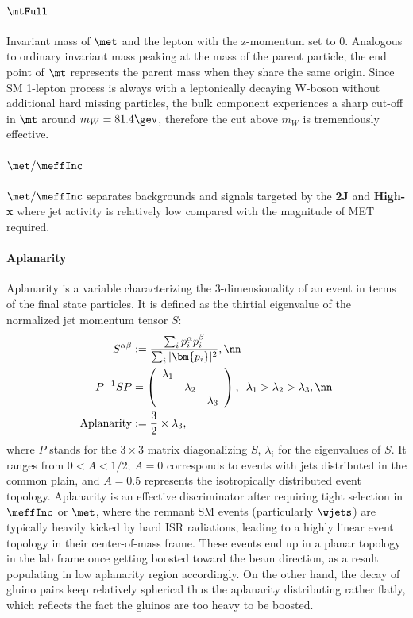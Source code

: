 \paragraph{${\bf \mtFull}$} 
Invariant mass of $\met$ and the lepton with the z-momentum set to 0.
Analogous to ordinary invariant mass peaking at the mass of the parent particle, the end point of $\mt$ represents the parent mass when they share the same origin.
Since SM 1-lepton process is always with a leptonically decaying W-boson without additional hard missing particles, the bulk component experiences a sharp cut-off in $\mt$ around $m_W = 81.4 \gev$, 
therefore the cut above $m_W$ is tremendously effective.


\paragraph{${\bf \met/\meffInc}$}
$\met/\meffInc$ separates backgrounds and signals targeted by the \textbf{2J} and \textbf{High-x} where jet activity is relatively low compared with the magnitude of MET required.


\paragraph{Aplanarity}
Aplanarity is a variable characterizing the 3-dimensionality of an event in terms of the final state particles. It is defined as the thirtial eigenvalue of the normalized jet momentum tensor $S$:
\begin{align}
  S^{\alpha \beta} & := \frac{\sum_i p_i^{\alpha} p_i^{\beta} }{\sum_i |\bm{p_i}|^2 }, \nn \\ 
  P^{-1}SP & = \left(
  \begin{array}{c c c }
    \lambda_1  & & \\
    & \lambda_2 & \\
    & & \lambda_3 \\
  \end{array}
  \right), \,\,\, \lambda_1 > \lambda_2 > \lambda_3, \nn \\
  \mathrm{Aplanarity} & := \frac {3}{2} \times \lambda_3,
\end{align}
where $P$ stands for the $3\times3$ matrix diagonalizing $S$, $\lambda_i$ for the eigenvalues of $S$.
It ranges from $0<A<1/2$; $A=0$ corresponds to events with jets distributed in the common plain, and $A=0.5$ represents the isotropically distributed event topology.
Aplanarity is an effective discriminator after requiring tight selection in $\meffInc$ or $\met$, where the remnant SM events (particularly $\wjets$) are typically heavily kicked by hard ISR radiations, leading to a highly linear event topology in their center-of-mass frame. These events end up in a planar topology in the lab frame once getting boosted toward the beam direction, as a result populating in low aplanarity region accordingly. 
On the other hand, the decay of gluino pairs keep relatively spherical thus the aplanarity distributing rather flatly, which reflects the fact the gluinos are too heavy to be boosted.


